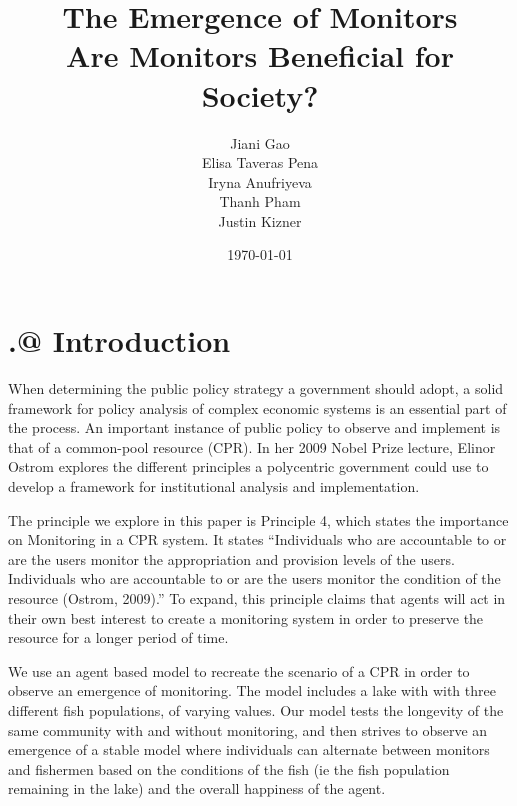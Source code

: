 \documentclass[12pt]{article}
\title{\bf The Emergence of Monitors\\
   \large Are Monitors Beneficial for Society? }
\author{Jiani Gao\\Elisa Taveras Pena\\Iryna Anufriyeva\\Thanh Pham\\Justin Kizner}
\affil{Department of Economics, Binghamton University}
\date{\today}
\makeatletter
\newcommand{\Rmnum}[1]{\expandafter\@slowromancap\romannumeral #1@}
\makeatother
\begin{document}
\maketitle
\newpage

\newpage
\noindent
\section{\Rmnum{1.} Introduction}
When determining the public policy strategy a government should adopt, a solid framework for policy analysis of complex economic systems is an essential part of the process.  An important instance of public policy to observe and implement is that of a common-pool resource (CPR). In her 2009 Nobel Prize lecture, Elinor Ostrom explores the different principles a polycentric government could use to develop a framework for institutional analysis and implementation. 

The principle we explore in this paper is Principle 4, which states the importance on Monitoring in a CPR system. It states “Individuals who are accountable to or are the users monitor the appropriation and provision levels of the users. Individuals who are accountable to or are the users monitor the condition of the resource (Ostrom, 2009).” To expand, this principle claims that agents will act in their own best interest to create a monitoring system in order to preserve the resource for a longer period of time.  

We use an agent based model to recreate the scenario of a CPR  in order to observe an emergence of monitoring. The model includes a lake with with three different fish populations, of varying values. Our model tests the longevity of the same community with and without monitoring, and then strives to observe an emergence of a stable model where individuals can alternate between monitors and fishermen based on the conditions of the fish (ie the fish population remaining in the lake) and the overall happiness of the agent.
\end{document}
